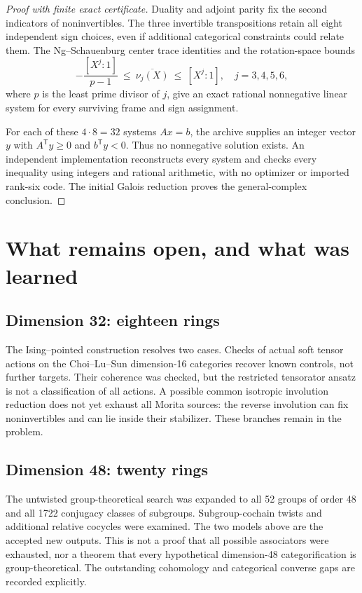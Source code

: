 \documentclass[11pt]{article}
\begin{document}
\begin{proof}[Proof with finite exact certificate]
Duality and adjoint parity fix the second indicators of noninvertibles. The three
invertible transpositions retain all eight independent sign choices,
even if additional categorical constraints could relate them. The
Ng--Schauenburg center trace identities \cite{NS} and the rotation-space bounds
\[
-\frac{[X^j:1]}{p-1}\ \leq\ \overline{\nu_j(X)}\ \leq\ [X^j:1],
\quad j=3,4,5,6,
\]
where $p$ is the least prime divisor of $j$, give an exact rational
nonnegative linear system for every surviving frame and sign assignment.

For each of these $4\cdot8=32$ systems $Ax=b$, the archive supplies an
integer vector $y$ with $A^{\mathsf T}y\geq0$ and $b^{\mathsf T}y<0$.
Thus no nonnegative solution exists. An independent implementation
reconstructs every system and checks every inequality using integers and
rational arithmetic, with no optimizer or imported rank-six code.
The initial Galois reduction proves the general-complex conclusion.
\end{proof}

\section{What remains open, and what was learned}
\subsection{Dimension 32: eighteen rings}
The Ising--pointed construction resolves two cases. Checks of actual
soft tensor actions on the Choi--Lu--Sun dimension-16 categories recover
known controls, not further targets. Their coherence was checked, but
the restricted tensorator ansatz is not a classification of all actions.
A possible common isotropic involution reduction does not yet exhaust
all Morita sources: the reverse involution can fix noninvertibles and
can lie inside their stabilizer. These branches remain in the problem.

\subsection{Dimension 48: twenty rings}
The untwisted group-theoretical search was expanded to all 52 groups of
order 48 and all 1722 conjugacy classes of subgroups. Subgroup-cochain
twists and additional relative cocycles were examined. The two models
above are the accepted new outputs. This is not a proof that all possible
associators were exhausted, nor a theorem that every hypothetical
dimension-48 categorification is group-theoretical. The outstanding
cohomology and categorical converse gaps are recorded explicitly.
\end{document}
